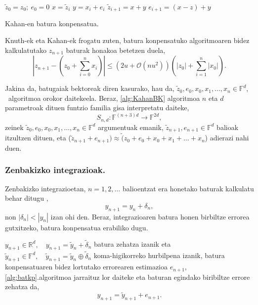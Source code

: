 \begin{algorithm}[H]
 \BlankLine
  $\tilde z_0= z_0; \ e_0=0$\;
  {
   \BlankLine
    $x=\tilde z_i$\;
    $y= x_i+e_i$\;
    $\tilde z_{i+1}=x+y$\;
    $e_{i+1}=(x-z)+y$\;
   \BlankLine
  }
 \caption{Kahan-en batura konpensatua.}
   \label{alg:KahanBK}
\end{algorithm}

Knuth-ek eta Kahan-ek \cite{Muller2009} frogatu zuten,  batura konpensatuko algoritmoaren bidez kalkulatutako $z_{n+1}$ baturak honakoa betetzen duela, 
\begin{equation*}
\left | z_{n+1} - (z_0+\sum_{i=0}^{n} x_i) \right | \leq (2u+ \mathcal{O}(nu^2)) \left(|z_0|+\sum_{i=1}^{n} |x_0|\right).
\end{equation*}

Jakina da, batugaiak bektoreak diren kasurako, hau da, $\tilde z_0, e_0, x_0, x_1, \dots, x_n \in \mathbb{F}^d$, ~algoritmoa orokor daitekeela. Beraz, \ref{alg:KahanBK} algoritmoa $n$ eta $d$ parametroak dituen funtzio familia gisa interpretatu daiteke,
\begin{equation}
\label{eq:batsd}
S_{n,d} : \mathbb{F}^{(n+3)d} \rightarrow \mathbb{F}^{2d},
\end{equation}
zeinek $\tilde z_0, e_0, x_0, x_1, \dots, x_n \in \mathbb{F}^d$ argumentuak emanik, $\tilde z_{n+1}, e_{n+1} \in \mathbb{F}^d$ balioak itzultzen dituen, eta ($\tilde z_{n+1}+e_{n+1}) \approx \tilde (z_0+e_0+x_0+x_1+ \dots+x_n$) adierazi nahi duen.

\subsubsection*{Zenbakizko integrazioak.}
 
Zenbakizko integrazioetan, $n=1,2,\dots$ balioentzat era honetako baturak kalkulatu behar ditugu \cite{Hairer2006},
\begin{equation*}
y_{n+1}=y_n+\delta_n,
\end{equation*}  
non $|\delta_n|<|y_n|$ izan ohi den. Beraz, integrazioaren batura honen birbiltze errorea gutxitzeko, batura konpensatua erabiliko dugu.  

$y_{n+1} \in \mathbb{R}^{d},\quad y_{n+1}=\tilde y_{n}+\tilde \delta_n$ batura zehatza izanik eta $\tilde y_{n+1} \in \mathbb{F}^{d}, \quad \tilde y_{n+1}=\tilde y_{n} \oplus \tilde \delta_n$ koma-higikorreko hurbilpena izanik, batura konpensatuaren bidez lortutako errorearen estimazioa $e_{n+1}$, \ref{alg:batkp}.algoritmoa jarraituz lor daiteke eta baturan egindako biribiltze errore zehatza da, 
\begin{equation}
y_{n+1}=\tilde {y}_{n+1}+e_{n+1}. 
\end{equation}

